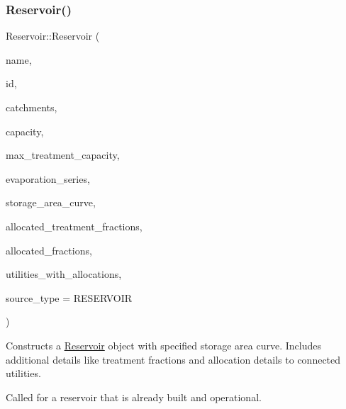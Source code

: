 \subsubsection{\texorpdfstring{Reservoir()}{Reservoir()}\hspace{0.1cm}{\footnotesize\ttfamily [5/9]}}
{\footnotesize\ttfamily Reservoir\+::\+Reservoir (\begin{DoxyParamCaption}\item[{const char $\ast$}]{name,  }\item[{const int}]{id,  }\item[{const vector$<$ \mbox{\hyperlink{classCatchment}{Catchment}} $\ast$$>$ \&}]{catchments,  }\item[{const double}]{capacity,  }\item[{const double}]{max\+\_\+treatment\+\_\+capacity,  }\item[{\mbox{\hyperlink{classEvaporationSeries}{Evaporation\+Series}} \&}]{evaporation\+\_\+series,  }\item[{\mbox{\hyperlink{classDataSeries}{Data\+Series}} $\ast$}]{storage\+\_\+area\+\_\+curve,  }\item[{vector$<$ double $>$ $\ast$}]{allocated\+\_\+treatment\+\_\+fractions,  }\item[{vector$<$ double $>$ $\ast$}]{allocated\+\_\+fractions,  }\item[{vector$<$ int $>$ $\ast$}]{utilities\+\_\+with\+\_\+allocations,  }\item[{int}]{source\+\_\+type = {\ttfamily RESERVOIR} }\end{DoxyParamCaption})}



Constructs a \mbox{\hyperlink{classReservoir}{Reservoir}} object with specified storage area curve. Includes additional details like treatment fractions and allocation details to connected utilities. 

Called for a reservoir that is already built and operational.


